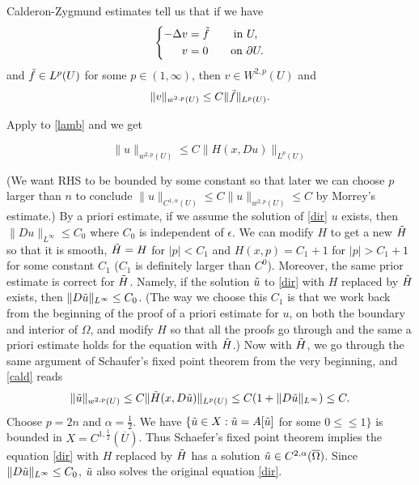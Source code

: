 \documentclass[11pt,reqno]{amsart}
\numberwithin{figure}{section}
\theoremstyle{plain}
\theoremstyle{remark}
\numberwithin{equation}{section}
\begin{document}
\begin{appendices}
\noindent Calderon-Zygmund estimates tell us that if we have
\begin{equation}
\label{cald}
\left\{
  \begin{aligned}
  - \Delta v &=\Tilde{f}   \qquad \, \text{in } U, \\
              v &= 0 \qquad \text{on } \partial U.
  \end{aligned}
\right.
\end{equation}
and $\Tilde{f} \in {L^p(U)}$ for some $p\in (1, \infty)$, then $v \in W^{2,p}(U)$ and $$\|v\|_{w^{2,p}(U)} \leq C\|\Tilde{f}\|_{L^p(U)}.$$ 

\noindent Apply to \eqref{lamb} and we get

\begin{equation}
    \|u\|_{w^{2,p}(U)} \leq C\|H(x, Du)\|_{L^p(U)}
\end{equation}


(We want RHS to be bounded by some constant so that later we can choose $p$ larger than $n$ to  conclude $ \|u\|_{C^{1, \alpha}(U)} \leq   C\|u\|_{w^{2,p}(U)} \leq C$ by Morrey's estimate.) By a priori estimate, if we assume the solution of \eqref{dir} $u$ exists, then $\| Du\|_{L^\infty} \leq C_0$ where $C_0$ is independent of $\epsilon$. We can modify $H$ to get a new $\Tilde{H}$ so that it is smooth, $\Tilde{H} = H$ for $|p|<C_1$ and $H(x,p)=C_1+1$ for $|p|>C_1+1$ for some constant $C_1$ ($C_1$ is definitely larger than $C^0$). Moreover, the same prior estimate is correct for $\Tilde{H}$. Namely, if the solution $\Tilde{u}$ to \eqref{dir} with $H$ replaced by $\Tilde{H}$ exists, then $\| D\Tilde{u}\|_{L^\infty} \leq C_0$. (The way we choose this $C_1$ is that we work back from the beginning of the proof of a priori estimate for $u$, on both the boundary and interior of $\Omega$, and modify $H$ so that all the proofs go through and the same a priori estimate holds for the equation with $\Tilde{H}$.) Now with $\Tilde{H}$, we go through the same argument of Schaufer's fixed point theorem from the very beginning, and \eqref{cald} reads
\begin{equation}
       \|\Tilde{u}\|_{w^{2,p}(U)} \leq C\|\Tilde{H}(x, D\Tilde{u})\|_{L^p(U)} \leq C(1+\|D\Tilde{u}\|_{L^\infty}) \leq C.
\end{equation}
Choose $p=2n$ and $\displaystyle \alpha =\frac{1}{2}$. We have $\{\Tilde{u}\in X : \Tilde{u}=  A[\Tilde{u}]$ for some $0 \leq    \leq 1\}$ is bounded in $X= C^{1, \frac{1}{2}}(
\overline{U})$.
Thus Schaefer's fixed point theorem implies the equation \eqref{dir} with $H$ replaced by $\Tilde{H}$ has a solution $\Tilde{u} \in C^{2,\alpha} (\overline{\Omega})$. Since $\| D\Tilde{u}\|_{L^\infty} \leq C_0$, $\Tilde{u}$ also solves the original equation \eqref{dir}.




\end{appendices}
\end{document}

